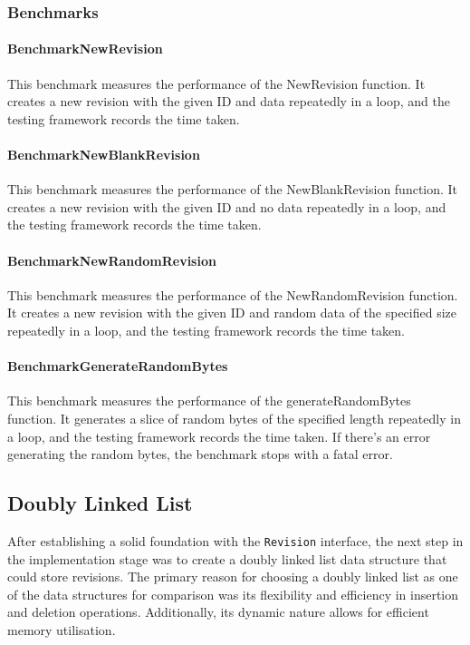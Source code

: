 \subsubsection*{Benchmarks}
\paragraph{BenchmarkNewRevision}
This benchmark measures the performance of the NewRevision function. It creates a new revision with the given ID and data repeatedly in a loop, and the testing framework records the time taken.

\paragraph{BenchmarkNewBlankRevision}
This benchmark measures the performance of the NewBlankRevision function. It creates a new revision with the given ID and no data repeatedly in a loop, and the testing framework records the time taken.

\paragraph{BenchmarkNewRandomRevision}
This benchmark measures the performance of the NewRandomRevision function. It creates a new revision with the given ID and random data of the specified size repeatedly in a loop, and the testing framework records the time taken.

\paragraph{BenchmarkGenerateRandomBytes}
This benchmark measures the performance of the generateRandomBytes function. It generates a slice of random bytes of the specified length repeatedly in a loop, and the testing framework records the time taken. If there's an error generating the random bytes, the benchmark stops with a fatal error.

\subsection{Doubly Linked List}
After establishing a solid foundation with the \lstinline{Revision} interface, the next step in the implementation stage was to create a doubly linked list data structure that could store revisions. The primary reason for choosing a doubly linked list as one of the data structures for comparison was its flexibility and efficiency in insertion and deletion operations. Additionally, its dynamic nature allows for efficient memory utilisation.
\smallskip

